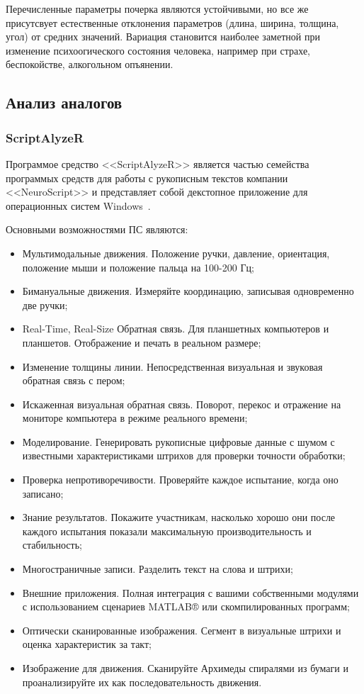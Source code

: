 Перечисленные параметры почерка являются устойчивыми, но все же присутсвует естественные отклонения параметров (длина, ширина, толщина, угол) от средних значений. Вариация становится наиболее заметной при изменение психоогического состояния человека, например при страхе, беспокойстве, алкогольном опъянении.

\subsection{Анализ аналогов}
\label{sub:domain:analogs}

\subsubsection{ScriptAlyzeR}
\label{sub:domain:analogs:neuro_script} 

Программое средство <<ScriptAlyzeR>> является частью семейства программых средств для работы с рукописным текстов компании <<NeuroScript>> и представляет собой декстопное приложение для операционных систем Windows~\cite{analogs_scriptAlyzer}.

Основными возможностями ПС являются:
\begin{itemize}
	\item Мультимодальные движения. Положение ручки, давление, ориентация, положение мыши и положение пальца на 100-200 Гц;
	\item Бимануальные движения. Измеряйте координацию, записывая одновременно две ручки;
	\item Real-Time, Real-Size Обратная связь. Для планшетных компьютеров и планшетов. Отображение и печать в реальном размере;
	\item Изменение толщины линии. Непосредственная визуальная и звуковая обратная связь с пером;
	\item Искаженная визуальная обратная связь. Поворот, перекос и отражение на мониторе компьютера в режиме реального времени;
	\item Моделирование. Генерировать рукописные цифровые данные с шумом с известными характеристиками штрихов для проверки точности обработки;
	\item Проверка непротиворечивости. Проверяйте каждое испытание, когда оно записано;
	\item Знание результатов. Покажите участникам, насколько хорошо они после каждого испытания показали максимальную производительность и стабильность;
	\item Многостраничные записи. Разделить текст на слова и штрихи;
	\item Внешние приложения. Полная интеграция с вашими собственными модулями с использованием сценариев MATLAB® или скомпилированных программ;
	\item Оптически сканированные изображения. Сегмент в визуальные штрихи и оценка характеристик за такт;
	\item Изображение для движения. Сканируйте Архимеды спиралями из бумаги и проанализируйте их как последовательность движения.
\end{itemize}

